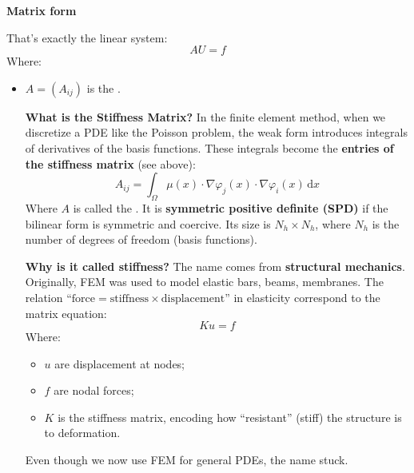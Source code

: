 \newpage

\begin{flushleft}
    \textcolor{Green3}{ \textbf{Matrix form}}
\end{flushleft}
That's exactly the linear system:
\begin{equation}
    A U = f
\end{equation}
Where:
\begin{itemize}
    \item $A = \left(A_{ij}\right)$ is the .

    \textcolor{Green3}{ \textbf{What is the Stiffness Matrix?}} In the finite element method, when we discretize a PDE like the Poisson problem, the weak form introduces integrals of derivatives of the basis functions. These integrals become the \textbf{entries of the stiffness matrix} (see above):
    \begin{equation}\label{eq: stiffness matrix}
        A_{ij} = \displaystyle\int_{\Omega} \mu(x) \cdot \nabla \varphi_j(x) \cdot \nabla \varphi_i(x)\, \mathrm{d}x
    \end{equation}
    Where $A$ is called the . It is \textbf{symmetric positive definite (SPD)} if the bilinear form is symmetric and coercive. Its size is $N_h \times N_h$, where $N_h$ is the number of degrees of freedom (basis functions).

    \textcolor{Green3}{ \textbf{Why is it called stiffness?}} The name comes from \textbf{structural mechanics}. Originally, FEM was used to model elastic bars, beams, membranes. The relation ``$\text{force} = \text{stiffness} \times \text{displacement}$'' in elasticity correspond to the matrix equation:
    \begin{equation*}
        K u = f
    \end{equation*}
    Where:
    \begin{itemize}
        \item $u$ are displacement at nodes;
        \item $f$ are nodal forces;
        \item $K$ is the stiffness matrix, encoding how ``resistant'' (stiff) the structure is to deformation.
    \end{itemize}
    Even though we now use FEM for general PDEs, the name stuck.


\end{itemize}
